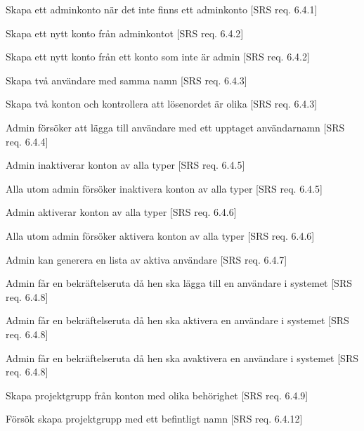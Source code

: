 \documentclass[a4paper]{article}
\begin{document}
\begin{appendices}
\begin{FT}
Skapa ett adminkonto när det inte finns ett adminkonto [SRS req. 6.4.1]

\item
Skapa ett nytt konto från adminkontot [SRS req. 6.4.2]

\item
Skapa ett nytt konto från ett konto som inte är admin [SRS req. 6.4.2]

\item
Skapa två användare med samma namn [SRS req. 6.4.3]

\item
Skapa två konton och kontrollera att lösenordet är olika [SRS req. 6.4.3]

\item
Admin försöker att lägga till användare med ett upptaget användarnamn [SRS req. 6.4.4]

\item
Admin inaktiverar konton av alla typer [SRS req. 6.4.5]

\item
Alla utom admin försöker inaktivera konton av alla typer [SRS req. 6.4.5]

\item
Admin aktiverar konton av alla typer [SRS req. 6.4.6]

\item
Alla utom admin försöker aktivera konton av alla typer [SRS req. 6.4.6]

\item
Admin kan generera en lista av aktiva användare [SRS req. 6.4.7]

\item
Admin får en bekräftelseruta då hen ska lägga till en användare i systemet [SRS req. 6.4.8]

\item
Admin får en bekräftelseruta då hen ska aktivera en användare i systemet [SRS req. 6.4.8]

\item
Admin får en bekräftelseruta då hen ska avaktivera en användare i systemet [SRS req. 6.4.8]

\item 

Skapa projektgrupp från konton med olika behörighet [SRS req. 6.4.9]

\item 

Försök skapa projektgrupp med ett befintligt namn [SRS req. 6.4.12]

\item 


\end{FT}
\end{appendices}
\end{document}
